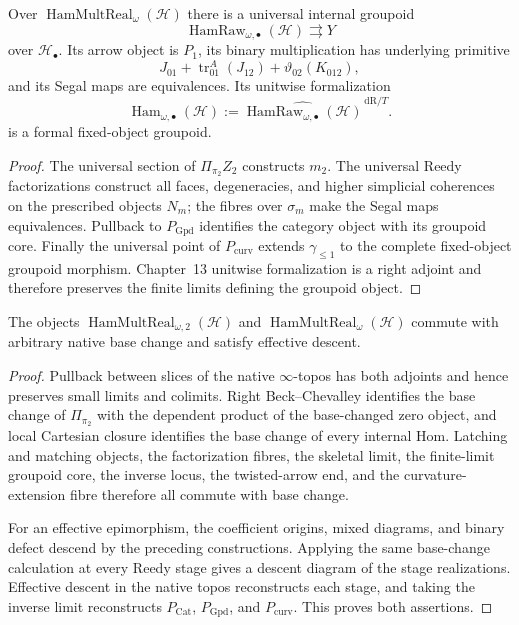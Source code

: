 \begin{theorem}
\label{thm:prequantum-raw-formal-hamiltonian-groupoids}
Over $\operatorname{HamMultReal}_{\omega}(\mathcal H)$ there is a universal
internal groupoid
\[
\operatorname{HamRaw}_{\omega,\bullet}(\mathcal H)
\rightrightarrows Y
\]
over $\mathcal H_\bullet$.  Its arrow object is $P_1$, its binary
multiplication has underlying primitive
\[
J_{01}+\operatorname{tr}_{01}^A(J_{12})+\vartheta_{02}(K_{012}),
\]
and its Segal maps are equivalences.  Its unitwise formalization
\[
\boxed{
\operatorname{Ham}_{\omega,\bullet}(\mathcal H)
:=
\widehat{\operatorname{HamRaw}_{\omega,\bullet}(\mathcal H)}^{\,\mathrm{dR}/T}.
}
\]
is a formal fixed-object groupoid.
\end{theorem}

\begin{proof}
The universal section of $\Pi_{\pi_2}Z_2$ constructs $m_2$.  The universal
Reedy factorizations construct all faces, degeneracies, and higher simplicial
coherences on the prescribed objects $N_m$; the fibres over $\sigma_m$ make the
Segal maps equivalences.  Pullback to $P_{\mathrm{Gpd}}$ identifies the category
object with its groupoid core.  Finally the universal point of
$P_{\mathrm{curv}}$ extends $\gamma_{\le1}$ to the complete fixed-object
groupoid morphism.  Chapter~13 unitwise formalization is a right adjoint and
therefore preserves the finite limits defining the groupoid object.
\end{proof}

\begin{proposition}
\label{prop:prequantum-hamiltonian-multiplicativity-base-change-descent}
The objects $\operatorname{HamMultReal}_{\omega,2}(\mathcal H)$ and
$\operatorname{HamMultReal}_{\omega}(\mathcal H)$ commute with arbitrary native
base change and satisfy effective descent.
\end{proposition}

\begin{proof}
Pullback between slices of the native $\infty$-topos has both adjoints and hence
preserves small limits and colimits.  Right Beck--Chevalley identifies the base
change of $\Pi_{\pi_2}$ with the dependent product of the base-changed zero
object, and local Cartesian closure identifies the base change of every internal
Hom.  Latching and matching objects, the factorization fibres, the skeletal
limit, the finite-limit groupoid core, the inverse locus, the twisted-arrow end,
and the curvature-extension fibre therefore all commute with base change.

For an effective epimorphism, the coefficient origins, mixed diagrams, and
binary defect descend by the preceding constructions.  Applying the same
base-change calculation at every Reedy stage gives a descent diagram of the
stage realizations.  Effective descent in the native topos reconstructs each
stage, and taking the inverse limit reconstructs $P_{\mathrm{Cat}}$,
$P_{\mathrm{Gpd}}$, and $P_{\mathrm{curv}}$.  This proves both assertions.
\end{proof}


